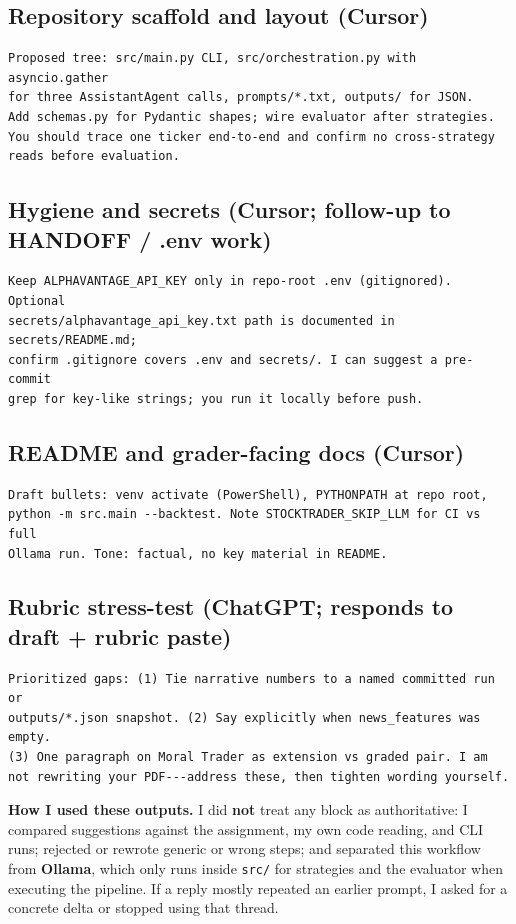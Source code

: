 \documentclass[11pt]{article}
\begin{document}
\subsection*{Repository scaffold and layout (Cursor)}
\begin{verbatim}
Proposed tree: src/main.py CLI, src/orchestration.py with asyncio.gather
for three AssistantAgent calls, prompts/*.txt, outputs/ for JSON.
Add schemas.py for Pydantic shapes; wire evaluator after strategies.
You should trace one ticker end-to-end and confirm no cross-strategy
reads before evaluation.
\end{verbatim}

\subsection*{Hygiene and secrets (Cursor; follow-up to HANDOFF / .env work)}
\begin{verbatim}
Keep ALPHAVANTAGE_API_KEY only in repo-root .env (gitignored). Optional
secrets/alphavantage_api_key.txt path is documented in secrets/README.md;
confirm .gitignore covers .env and secrets/. I can suggest a pre-commit
grep for key-like strings; you run it locally before push.
\end{verbatim}

\subsection*{README and grader-facing docs (Cursor)}
\begin{verbatim}
Draft bullets: venv activate (PowerShell), PYTHONPATH at repo root,
python -m src.main --backtest. Note STOCKTRADER_SKIP_LLM for CI vs full
Ollama run. Tone: factual, no key material in README.
\end{verbatim}

\subsection*{Rubric stress-test (ChatGPT; responds to draft + rubric paste)}
\begin{verbatim}
Prioritized gaps: (1) Tie narrative numbers to a named committed run or
outputs/*.json snapshot. (2) Say explicitly when news_features was empty.
(3) One paragraph on Moral Trader as extension vs graded pair. I am
not rewriting your PDF---address these, then tighten wording yourself.
\end{verbatim}

\noindent\textbf{How I used these outputs.} I did \textbf{not} treat any block as authoritative: I compared suggestions against the assignment, my own code reading, and CLI runs; rejected or rewrote generic or wrong steps; and separated this workflow from \textbf{Ollama}, which only runs inside \texttt{src/} for strategies and the evaluator when executing the pipeline. If a reply mostly repeated an earlier prompt, I asked for a concrete delta or stopped using that thread.
\end{document}
